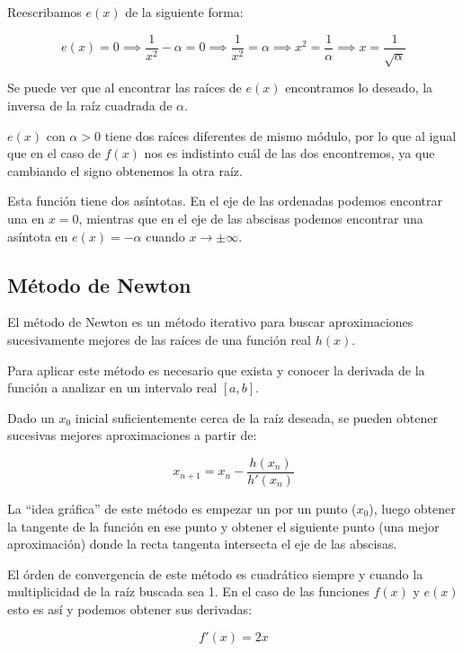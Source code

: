Reescribamos $e(x)$ de la siguiente forma:

\[
    e(x) = 0 \implies
    \frac{ 1 }{ x^2 } - \alpha = 0 \implies
    \frac{ 1 }{ x^2 } = \alpha \implies
    x^2 = \frac{ 1 }{ \alpha } \implies
    x = \frac{ 1 }{ \sqrt{\alpha} }
\]

Se puede ver que al encontrar las raíces de $e(x)$ encontramos lo deseado, la
inversa de la raíz cuadrada de $\alpha$.

$e(x)$ con $\alpha > 0$ tiene dos raíces diferentes de mismo módulo, por lo que
al igual que en el caso de $f(x)$ nos es indistinto cuál de las dos
encontremos, ya que cambiando el signo obtenemos la otra raíz.

Esta función tiene dos asíntotas. En el eje de las ordenadas podemos encontrar
una en $x = 0$, mientras que en el eje de las abscisas podemos encontrar una
asíntota en $e(x) = - \alpha$ cuando $x \to \pm \infty$.

\subsection{Método de Newton}

El método de Newton es un método iterativo para buscar aproximaciones
sucesivamente mejores de las raíces de una función real $h(x)$.

Para aplicar este método es necesario que exista y conocer la derivada de la
función a analizar en un intervalo real $[a, b]$.

Dado un $x_0$ inicial suficientemente cerca de la raíz deseada, se pueden
obtener sucesivas mejores aproximaciones a partir de:

\begin{equation}\label{newton}
    x_{n + 1} = x_n - \frac{ h(x_n) }{ h'(x_n) }
\end{equation}

La ``idea gráfica'' de este método es empezar un por un punto ($x_0$), luego
obtener la tangente de la función en ese punto y obtener el siguiente punto
(una mejor aproximación) donde la recta tangenta intersecta el eje de las
abscisas.

El órden de convergencia de este método es cuadrático siempre y cuando la
multiplicidad de la raíz buscada sea 1. En el caso de las funciones $f(x)$ y
$e(x)$ esto es así y podemos obtener sus derivadas:

\begin{equation}\label{f1_x}
    f'(x) = 2x
\end{equation}


